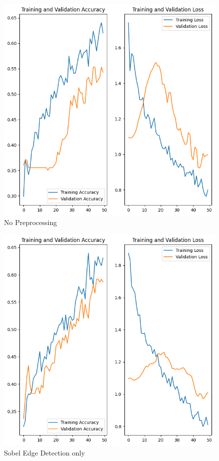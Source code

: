\begin{figure}[H]
  \includegraphics[width=\linewidth]{figures/without_preprocessing.png}
  \caption{No Preprocessing}
  \label{fig:no_preprocessing_plots}
\end{figure}

\begin{figure}[H]
  \includegraphics[width=\linewidth]{figures/training_validation_results.png}
  \caption{Sobel Edge Detection only}
  \label{fig:sobel_edge_plots}
\end{figure}

